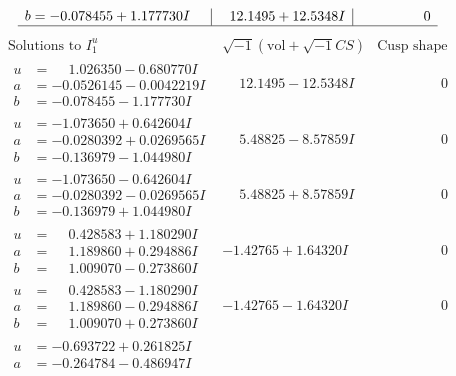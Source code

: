 \documentclass[1p]{elsarticle_modified}
\theoremstyle{definition}
\newcommand{\I}{\sqrt{-1}}
\begin{document}
$$\begin{array}{c|c|c}
\begin{aligned}
b &= -0.078455 + 1.177730 I\end{aligned}
 & \phantom{-}12.1495 + 12.5348 I & \phantom{-0.000000 } 0\\
 \hline 
 \end{array}$$\newpage$$\begin{array}{c|c|c}  
\text{Solutions to }I^u_{1}& \I (\text{vol} + \sqrt{-1}CS) & \text{Cusp shape}\\
 \hline 
\begin{aligned}
u &= \phantom{-}1.026350 - 0.680770 I \\
a &= -0.0526145 - 0.0042219 I \\
b &= -0.078455 - 1.177730 I\end{aligned}
 & \phantom{-}12.1495 - 12.5348 I & \phantom{-0.000000 } 0 \\ \hline\begin{aligned}
u &= -1.073650 + 0.642604 I \\
a &= -0.0280392 + 0.0269565 I \\
b &= -0.136979 - 1.044980 I\end{aligned}
 & \phantom{-}5.48825 - 8.57859 I & \phantom{-0.000000 } 0 \\ \hline\begin{aligned}
u &= -1.073650 - 0.642604 I \\
a &= -0.0280392 - 0.0269565 I \\
b &= -0.136979 + 1.044980 I\end{aligned}
 & \phantom{-}5.48825 + 8.57859 I & \phantom{-0.000000 } 0 \\ \hline\begin{aligned}
u &= \phantom{-}0.428583 + 1.180290 I \\
a &= \phantom{-}1.189860 + 0.294886 I \\
b &= \phantom{-}1.009070 - 0.273860 I\end{aligned}
 & -1.42765 + 1.64320 I & \phantom{-0.000000 } 0 \\ \hline\begin{aligned}
u &= \phantom{-}0.428583 - 1.180290 I \\
a &= \phantom{-}1.189860 - 0.294886 I \\
b &= \phantom{-}1.009070 + 0.273860 I\end{aligned}
 & -1.42765 - 1.64320 I & \phantom{-0.000000 } 0 \\ \hline\begin{aligned}
u &= -0.693722 + 0.261825 I \\
a &= -0.264784 - 0.486947 I \\

\end{aligned}
\end{array}$$
\end{document}
